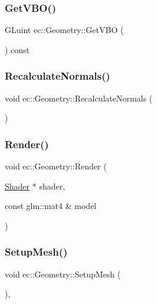 \subsubsection{\texorpdfstring{Get\+V\+B\+O()}{GetVBO()}}
{\footnotesize\ttfamily G\+Luint ec\+::\+Geometry\+::\+Get\+V\+BO (\begin{DoxyParamCaption}{ }\end{DoxyParamCaption}) const}

\mbox{\label{classec_1_1_geometry_a660f620c773555a6f9b4f2ad38384450}} 
\subsubsection{\texorpdfstring{Recalculate\+Normals()}{RecalculateNormals()}}
{\footnotesize\ttfamily void ec\+::\+Geometry\+::\+Recalculate\+Normals (\begin{DoxyParamCaption}{ }\end{DoxyParamCaption})\hspace{0.3cm}{\ttfamily [virtual]}}

\mbox{\label{classec_1_1_geometry_a8de70c6fd7391ec0555b2df57912b177}} 
\subsubsection{\texorpdfstring{Render()}{Render()}}
{\footnotesize\ttfamily void ec\+::\+Geometry\+::\+Render (\begin{DoxyParamCaption}\item[{\mbox{\hyperlink{classec_1_1_shader}{Shader}} $\ast$}]{shader,  }\item[{const glm\+::mat4 \&}]{model }\end{DoxyParamCaption})\hspace{0.3cm}{\ttfamily [virtual]}}

\mbox{\label{classec_1_1_geometry_aec31f79de7f0afb78d4e3eb77b43574e}} 
\subsubsection{\texorpdfstring{Setup\+Mesh()}{SetupMesh()}}
{\footnotesize\ttfamily void ec\+::\+Geometry\+::\+Setup\+Mesh (\begin{DoxyParamCaption}{ }\end{DoxyParamCaption})\hspace{0.3cm}{\ttfamily [protected]}, {\ttfamily [virtual]}}



